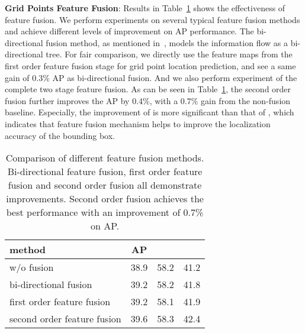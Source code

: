 \documentclass[10pt,twocolumn,letterpaper]{article}
\begin{document}
\textbf{Grid Points Feature Fusion}: Results in Table~\ref{tab:fusion} shows the effectiveness of feature fusion. We perform experiments on several typical feature fusion methods and achieve different levels of improvement on AP performance. The bi-directional fusion method, as mentioned in~\cite{chu2016structured}, models the information flow as a bi-directional tree. 
For fair comparison, we directly use the feature maps from the first order feature fusion stage for grid point location prediction, and see a same gain of 0.3\% AP as bi-directional fusion. And we also perform experiment of the complete two stage feature fusion. As can be seen in Table~\ref{tab:fusion}, the second order fusion further improves the AP by 0.4\%, with a 0.7\% gain from the non-fusion baseline. Especially, the improvement of  is more significant than that of , which indicates that feature fusion mechanism helps to improve the localization accuracy of the bounding box.

\begin{table}[t]
\begin{center}
\begin{tabular}{ l | c | c  c }
\hline
method & AP &  &  \\
\hline
w/o fusion  & 38.9 & 58.2 & 41.2 \\
bi-directional fusion~\cite{chu2016structured}  & 39.2 & 58.2 & 41.8  \\
first order feature fusion  & 39.2 & 58.1 & 41.9  \\
second order feature fusion  & 39.6 & 58.3 & 42.4 \\
\hline
\end{tabular}
\vspace{1mm}
\caption{Comparison of different feature fusion methods. Bi-directional feature fusion, first order feature fusion and second order fusion all demonstrate improvements. Second order fusion achieves the best performance with an improvement of 0.7\% on AP.}
\label{tab:fusion}
\end{center}
\end{table}
\end{document}
